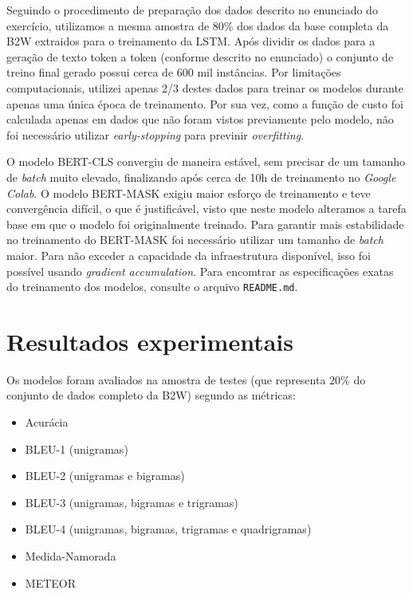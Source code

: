 \documentclass{article}
\begin{document}
Seguindo o procedimento de preparação dos dados descrito no enunciado do exercício, utilizamos a mesma amostra de 80\% dos dados da base completa da B2W extraidos para o treinamento da LSTM. Após dividir os dados para a geração de texto token a token (conforme descrito no enunciado) o conjunto de treino final gerado possui cerca de 600 mil instâncias. Por limitações computacionais, utilizei apenas 2/3 destes dados para treinar os modelos durante apenas uma única época de treinamento. Por sua vez, como a função de custo foi calculada apenas em dados que não foram vistos previamente pelo modelo, não foi necessário utilizar \textit{early-stopping} para previnir \textit{overfitting}.

O modelo BERT-CLS convergiu de maneira estável, sem precisar de um tamanho de \textit{batch} muito elevado, finalizando após cerca de 10h de treinamento no \textit{Google Colab}. O modelo BERT-MASK exigiu maior esforço de treinamento e teve convergência difícil, o que é justificável, visto que neste modelo alteramos a tarefa base em que o modelo foi originalmente treinado. Para garantir mais estabilidade no treinamento do BERT-MASK foi necessário utilizar um tamanho de \textit{batch} maior. Para não exceder a capacidade da infraestrutura disponível, isso foi possível usando \textit{gradient accumulation}. Para encomtrar as especificações exatas do treinamento dos modelos, consulte o arquivo \texttt{README.md}.

\vspace{5em}

\section{Resultados experimentais}

Os modelos foram avaliados na amostra de testes (que representa 20\% do conjunto de dados completo da B2W) segundo as métricas:

\begin{itemize}
	\item Acurácia
	\item BLEU-1 (unigramas)
	\item BLEU-2 (unigramas e bigramas)
	\item BLEU-3 (unigramas, bigramas e trigramas)
	\item BLEU-4 (unigramas, bigramas, trigramas e quadrigramas)
	\item Medida-Namorada
	\item METEOR
\end{itemize}
\end{document}

